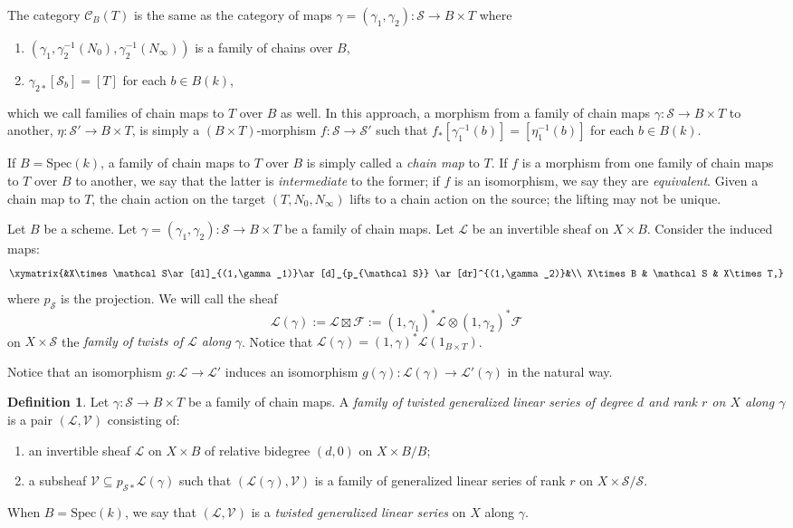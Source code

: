 \documentclass[a4paper,11pt]{amsart}
\theoremstyle{plain}
\theoremstyle{definition}
\newtheorem{defn}[thm]{Definition}
\theoremstyle{remark}
\def\L{\mathcal{L}}
\def\V{\mathcal{V}}
\def\F{\mathcal{F}}
\def\:{\colon}
\begin{document}
The category $\mathcal C_B(T)$ is the same as the category of maps 
$\gamma=(\gamma_1,\gamma_2)\:\mathcal S\to B\times T$ where
\begin{enumerate}
    \item $(\gamma_1,\gamma_2^{-1}(N_0),\gamma_2^{-1}(N_\infty))$ is a family of chains over $B$,
    \item $\gamma_{2*}[\mathcal S_b]=[T]$ for each $b\in B(k)$,
\end{enumerate}
which we call families of chain maps to $T$ over $B$ as well. In this approach, a morphism from a family of chain maps $\gamma\:\mathcal S\to B\times T$ to another, $\eta\:\mathcal S'\to B\times T$, is simply a $(B\times T)$-morphism $f\:\mathcal S\to\mathcal S'$ such that $f_*[\gamma_1^{-1}(b)]=[\eta_1^{-1}(b)]$ for each $b\in B(k)$.

If $B=\mathrm{Spec}(k)$, a family of chain maps to $T$ over $B$ is simply called a \emph{chain map} to $T$. If $f$ is a morphism from one family of chain maps to $T$ over $B$ to another, we say that the latter is \emph{intermediate} to the former; if $f$ is an isomorphism, we say they are \emph{equivalent}. Given a chain map to $T$, the chain action on the target $(T,N_0,N_\infty)$ lifts to a chain action on the source; the lifting may not be unique.

Let $B$ be a scheme. Let $\gamma=(\gamma_1,\gamma_2)\:\mathcal S\to B\times T$ be a family of chain maps. Let $\L$ be an invertible sheaf on
$X\times B$. Consider the induced maps:
\begin{equation}
\xymatrix{&X\times\mathcal S\ar[dl]_{(1,\gamma_1)}\ar[d]_{p_{\mathcal S}} \ar[dr]^{(1,\gamma_2)}&\\
X\times B & \mathcal S & X\times T,}
\end{equation}
where $p_{\mathcal S}$ is the projection. We will call the sheaf
$$
\L(\gamma):=\L\boxtimes\F:=(1,\gamma_1)^*\L\otimes(1,\gamma_2)^*\F
$$
on $X\times\mathcal S$ the \emph{family of twists of $\L$ along} $\gamma$. Notice that $\L(\gamma)=(1,\gamma)^*\L(1_{B\times T})$.

Notice that an isomorphism $g\:\L\to\L'$ induces an isomorphism $g(\gamma)\:\L(\gamma)\to\L'(\gamma)$ in the natural way. 

\begin{defn}\label{tgls} Let $\gamma\:\mathcal S\to B\times T$ be a family of chain maps. A \emph{family of twisted generalized linear series of degree $d$ and rank $r$ on $X$ along $\gamma$} is a pair $(\L,\V)$ consisting of:
\begin{enumerate}
\item an invertible sheaf $\L$ on $X\times B$ of relative bidegree $(d,0)$ on $X\times B/B$;
\item a subsheaf $\V\subseteq p_{\mathcal S\ast}\L(\gamma)$ such that $(\L(\gamma),\V)$ is a family of generalized linear series of rank $r$ on $X\times\mathcal S/\mathcal S$.
\end{enumerate}
When $B=\text{Spec}(k)$, we say that $(\L,\V)$ is a \emph{twisted generalized linear series} on $X$ along $\gamma$.
\end{defn}
\end{document}
